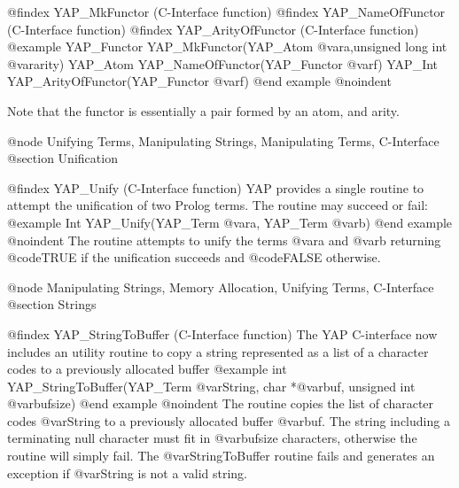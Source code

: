 {{{{{{{{{@findex YAP_MkFunctor (C-Interface function)
@findex YAP_NameOfFunctor (C-Interface function)
@findex YAP_ArityOfFunctor (C-Interface function)
@example
      YAP_Functor  YAP_MkFunctor(YAP_Atom @var{a},unsigned long int @var{arity})
      YAP_Atom     YAP_NameOfFunctor(YAP_Functor @var{f})
      YAP_Int      YAP_ArityOfFunctor(YAP_Functor @var{f})
@end example
@noindent

Note that the functor is essentially a pair formed by an atom, and
arity.

@node Unifying Terms, Manipulating Strings, Manipulating Terms, C-Interface
@section Unification

@findex YAP_Unify (C-Interface function)
YAP provides a single routine to attempt the unification of two Prolog
terms. The routine may succeed or fail:
@example
      Int      YAP_Unify(YAP_Term @var{a}, YAP_Term @var{b})
@end example
@noindent
The routine attempts to unify the terms @var{a} and
@var{b} returning @code{TRUE} if the unification succeeds and @code{FALSE}
otherwise.

@node Manipulating Strings, Memory Allocation, Unifying Terms, C-Interface
@section Strings

@findex YAP_StringToBuffer (C-Interface function)
The YAP C-interface now includes an utility routine to copy a string
represented as a list of a character codes to a previously allocated buffer
@example
      int YAP_StringToBuffer(YAP_Term @var{String}, char *@var{buf}, unsigned int @var{bufsize})
@end example
@noindent
The routine copies the list of character codes @var{String} to a
previously allocated buffer @var{buf}. The string including a
terminating null character must fit in @var{bufsize} characters,
otherwise the routine will simply fail. The @var{StringToBuffer} routine
fails and generates an exception if @var{String} is not a valid string.

}}}}}}}}}
